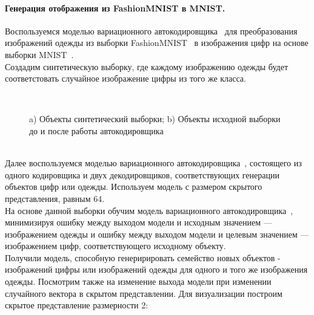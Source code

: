 \paragraph{Генерация отображения из FashionMNIST в MNIST.}
Воспользуемся моделью вариационного автокодировщика~\cite{VAE} для преобразования изображений одежды из выборки FashionMNIST~\cite{FMNIST} в изображения цифр на основе выборки MNIST~\cite{VAE}.\\
Создадим синтетическую выборку, где каждому изображению одежды будет соответстовать случайное изображение цифры из того же класса.\\
\begin{figure}[h!t]\center
{}
\qquad
{}\\
\caption{a) Объекты синтетический выборки; b) Объекты исходной выборки до и после работы автокодировщика}
\end{figure}\\
Далее воспользуемся моделью вариационного автокодировщика~\cite{VAE}, состоящего из одного кодировщика и двух декодировщиков, соответствующих генерации объектов цифр или одежды. Используем модель с размером скрытого представления, равным 64.\\
На основе данной выборки обучим модель вариационного автокодировщика~\cite{VAE}, минимизируя ошибку между выходом модели и исходным значением --- изображением одежды и ошибку между выходом модели и целевым значением --- изображением цифр, соответствующего исходному объекту.\\
Получили модель, способную генеририровать семейство новых объектов - изображений цифры или изображений одежды для одного и того же изображения одежды.
\newpage
Посмотрим также на изменение выхода модели при изменении случайного вектора в скрытом представлении. Для визуализации построим скрытое представление размерности 2:\\

